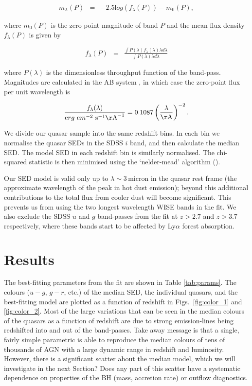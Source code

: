 \begin{eqnarray}
  m_\lambda(P) & = & -2.5{\mathrm log}(f_\lambda(P)) - m_0(P), 
\end{eqnarray}

where $m_0(P)$ is the zero-point magnitude of band $P$ and the mean flux density $f_{\lambda}(P)$ is given by 

\begin{eqnarray}
  \label{eq:flux}
  f_{\lambda}(P) & = & \frac{\int P(\lambda) f_\lambda(\lambda) \lambda d\lambda }{\int P(\lambda) \lambda d\lambda}
\end{eqnarray}

where $P(\lambda)$ is the dimensionless throughput function of the band-pass. 
Magnitudes are calculated in the AB system \citep{oke83}, in which case the zero-point flux per unit wavelength is 

\begin{eqnarray}
  \frac{f_\lambda(\lambda)}{{\mathrm erg}~{\mathrm cm}^{-2}~{\mathrm s}^{-1} {\mathrm\AA}^{-1}} = 0.1087 \left(\frac{\lambda}{\mathrm \AA}\right)^{-2}.
\end{eqnarray}


We divide our quasar sample into the same redshift bins.
In each bin we normalise the quasar SEDs in the SDSS $i$ band, and then calculate the median SED. 
The model SED in each redshift bin is similarly normalised. 
The chi-squared statistic is then minimised using the `nelder-mead' algorithm (). 

Our SED model is valid only up to $\lambda \sim 3$\,micron in the quasar rest frame (the approximate wavelength of the peak in hot dust emission); beyond this additional contributions to the total flux from cooler dust will become significant. 
This prevents us from using the two longest wavelength WISE bands in the fit. 
We also exclude the SDSS $u$ and $g$ band-passes from the fit at $z > 2.7$ and $z > 3.7$ respectively, where these bands start to be affected by Ly$\alpha$ forest absorption.

\section{Results}

The best-fitting parameters from the fit are shown in Table \ref{tab:params}. 
The colours ($u - g$, $g - r$, etc.) of the median SED, the individual quasars, and the best-fitting model are plotted as a function of redshift in Figs.~\ref{fig:color_1} and \ref{fig:color_2}.
Most of the large variations that can be seen in the median colours of the quasars as a function of redshift are due to strong emission-lines being redshifted into and out of the band-passes.
Take away message is that a single, fairly simple parametric is able to reproduce the median colours of tens of thousands of AGN with a large dynamic range in redshift and luminosity. 
However, there is a significant scatter about the median model, which we will investigate in the next Section?
Does any part of this scatter have a systematic dependence on properties of the BH (mass, accretion rate) or outflow diagnostics.  

